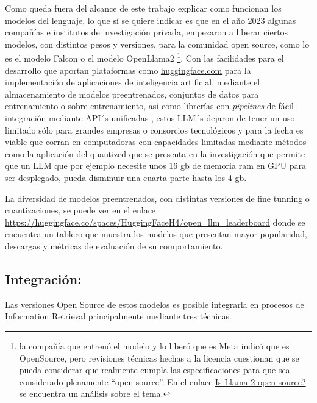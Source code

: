 \documentclass[
  12pt,
  openany]{book}
\begin{document}
Como queda fuera del alcance de este trabajo explicar como funcionan los modelos del lenguaje, lo que sí se quiere indicar es que en el año 2023 algunas compañías e institutos de investigación privada, empezaron a liberar ciertos modelos, con distintos pesos y versiones, para la comunidad open source, como lo es el modelo Falcon \citep{penedo2023} o el modelo OpenLlama2 \citep{touvron2023} \footnote{la compañía que entrenó el modelo y lo liberó que es Meta indicó que es OpenSource, pero revisiones técnicas hechas a la licencia cuestionan que se pueda considerar que realmente cumpla las especificaciones para que sea considerado plenamente ``open source''. En el enlace \href{https://opensourceconnections.com/blog/2023/07/19/is-llama-2-open-source-no-and-perhaps-we-need-a-new-definition-of-open/}{Is Llama 2 open source?} se encuentra un análisis sobre el tema.}. Con las facilidades para el desarrollo que aportan plataformas como \url{huggingface.com} para la implementación de aplicaciones de inteligencia artificial, mediante el almacenamiento de modelos preentrenados, conjuntos de datos para entrenamiento o sobre entrenamiento, así como librerías con \emph{pipelines} de fácil integración mediante API´s unificadas \citep{wolf2019}, estos LLM´s dejaron de tener un uso limitado sólo para grandes empresas o consorcios tecnológicos y para la fecha es viable que corran en computadoras con capacidades limitadas mediante métodos como la aplicación del quantized que se presenta en la investigación \citep{dettmers2023} que permite que un LLM que por ejemplo necesite unos 16 gb de memoria ram en GPU para ser desplegado, pueda disminuir una cuarta parte hasta los 4 gb.

La diversidad de modelos preentrenados, con distintas versiones de fine tunning o cuantizaciones, se puede ver en el enlace \citep{openllm} \url{https://huggingface.co/spaces/HuggingFaceH4/open_llm_leaderboard} donde se encuentra un tablero que muestra los modelos que presentan mayor popularidad, descargas y métricas de evaluación de su comportamiento.

\hypertarget{int}{%
\subsection{Integración:}\label{int}}

Las versiones Open Source de estos modelos es posible integrarla en procesos de Information Retrieval principalmente mediante tres técnicas.
\end{document}
